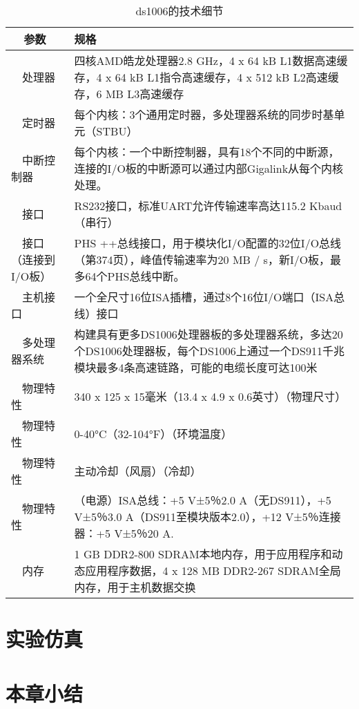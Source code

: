 \begin {table}[!htb]
\caption {ds1006的技术细节}
\begin{tabular} {|p{4cm}|p{10cm}|} \hline \hline

  参数&规格\\ \hline
  处理器&四核AMD皓龙处理器2.8 GHz，4 x 64 kB L1数据高速缓存，4 x 64 kB L1指令高速缓存，4 x 512 kB L2高速缓存，6 MB L3高速缓存\\ \hline
  定时器&每个内核：3个通用定时器，多处理器系统的同步时基单元（STBU）\\ \hline
  中断控制器&每个内核：一个中断控制器，具有18个不同的中断源，连接的I/O板的中断源可以通过内部Gigalink从每个内核处理。 \\ \hline

  接口&RS232接口，标准UART允许传输速率高达115.2 Kbaud（串行）\\ \hline
  接口（连接到I/O板）&PHS ++总线接口，用于模块化I/O配置的32位I/O总线（第374页），峰值传输速率为20 MB / s，新I/O板，最多64个PHS总线中断。 \\ \hline

  主机接口&一个全尺寸16位ISA插槽，通过8个16位I/O端口（ISA总线）接口\\ \hline

  多处理器系统&构建具有更多DS1006处理器板的多处理器系统，多达20个DS1006处理器板，每个DS1006上通过一个DS911千兆模块最多4条高速链路，可能的电缆长度可达100米\\ \hline

  物理特性&340 x 125 x 15毫米（13.4 x 4.9 x 0.6英寸）（物理尺寸）\\ \hline
  物理特性&0-40°C（32-104°F）（环境温度）\\ \hline
  物理特性&主动冷却（风扇）（冷却）\\ \hline
  物理特性&（电源）ISA总线：+5 V±5％2.0 A（无DS911），+5 V±5％3.0 A（DS911至模块版本2.0），+12 V±5％连接器：+5 V±5％20 A. \\ \hline


  内存&1 GB DDR2-800 SDRAM本地内存，用于应用程序和动态应用程序数据，4 x 128 MB DDR2-267 SDRAM全局内存，用于主机数据交换\\ \hline\hline
\end{tabular}
\end{table}

\section{实验仿真}
\label{sec:insertimage}

\section{本章小结}
\label{sec:insertimage}

